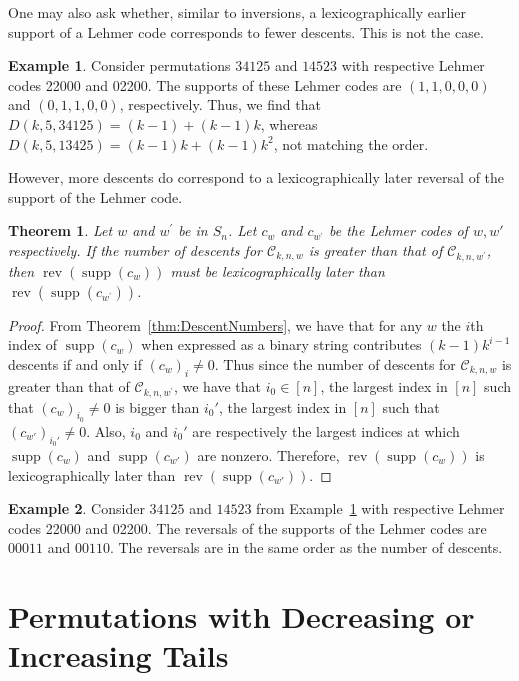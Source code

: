 \documentclass[final]{dmtcs-episciences}
\newtheorem{theorem}{Theorem}[section]
\theoremstyle{definition}
\newtheorem{example}{Example}
\theoremstyle{remark}
\DeclareMathOperator{\supp}{supp}
\DeclareMathOperator{\rev}{rev}
\begin{document}
One may also ask whether, similar to inversions, a lexicographically earlier support of a Lehmer code corresponds to fewer descents. This is not the case.

\begin{example}\label{ex:Permutations}
Consider permutations $34125$ and $14523$ with respective Lehmer codes 22000 and 02200. The supports of these Lehmer codes are $(1,1, 0, 0, 0)$ and $(0, 1, 1, 0, 0)$, respectively. Thus, we find that $D(k,5, 34125)=(k-1)+(k-1)k$, whereas $D(k,5,13425) = (k-1)k + (k-1)k^2$, not matching the order.
\end{example}

However, more descents do correspond to a lexicographically later reversal of the support of the Lehmer code.

\begin{theorem}
Let $w$ and $w^\prime$ be in $S_n$. Let $c_w$ and $c_{w^\prime}$ be the Lehmer codes of $w, w'$ respectively. If the number of descents for $\mathcal{C}_{k,n,w}$ is greater than that of $\mathcal{C}_{k,n,{w^\prime}}$, then $\rev(\supp(c_w))$ must be lexicographically later than $\rev(\supp(c_{w^\prime}))$.
\end{theorem}

\begin{proof}
From Theorem~\ref{thm:DescentNumbers}, we have that for any $w$ the $i$th index of $\supp(c_w)$ when expressed as a binary string contributes $(k-1)k^{i-1}$ descents if and only if $(c_w)_i \neq 0$. Thus since the number of descents for $\mathcal{C}_{k,n,w} $ is greater than that of $\mathcal{C}_{k,n,{w^\prime}}$, we have that $i_0 \in [n]$, the largest index in $[n]$ such that $(c_w)_{i_0} \neq 0$ is bigger than $i_0'$, the largest index in $[n]$ such that $(c_{w'})_{i_0'} \neq 0$. Also, $i_0$ and $i_0'$ are respectively the largest indices at which $\supp(c_w)$ and $\supp(c_{w'})$ are nonzero. Therefore, $\rev(\supp(c_{w}))$ is lexicographically later than $\rev(\supp(c_{w'}))$.
\end{proof}

\begin{example}
    Consider $34125$ and $14523$ from Example~\ref{ex:Permutations} with respective Lehmer codes 22000 and 02200. The reversals of the supports of the Lehmer codes are $00011$ and $00110$. The reversals are in the same order as the number of descents.
\end{example}


\section{Permutations with Decreasing or Increasing Tails}
\label{sec:TailsExamples}
\end{document}
